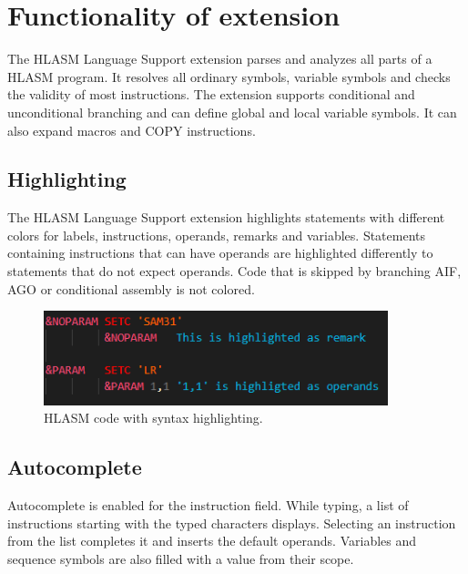 \section{Functionality of extension}
\label{sec:features}
The HLASM Language Support extension parses and analyzes all parts of a HLASM program. It resolves all ordinary symbols, variable symbols and checks the validity of most instructions. The extension supports conditional and unconditional branching and can define global and local variable symbols. It can also expand macros and COPY instructions.

\subsection{Highlighting}
The HLASM Language Support extension highlights statements with different colors for labels, instructions, operands, remarks and variables. Statements containing instructions that can have operands are highlighted differently to statements that do not expect operands. Code that is skipped by branching AIF, AGO or conditional assembly is not colored.

\begin{figure}[h]
	\centering
	\includegraphics[width=10cm]{img/highligting}
	\caption{HLASM code with syntax highlighting.}
\end{figure}

\subsection{Autocomplete}
Autocomplete is enabled for the instruction field. While typing, a list of instructions starting with the typed characters displays. Selecting an instruction from the list completes it and inserts the default operands. Variables and sequence symbols are also filled with a value from their scope.

